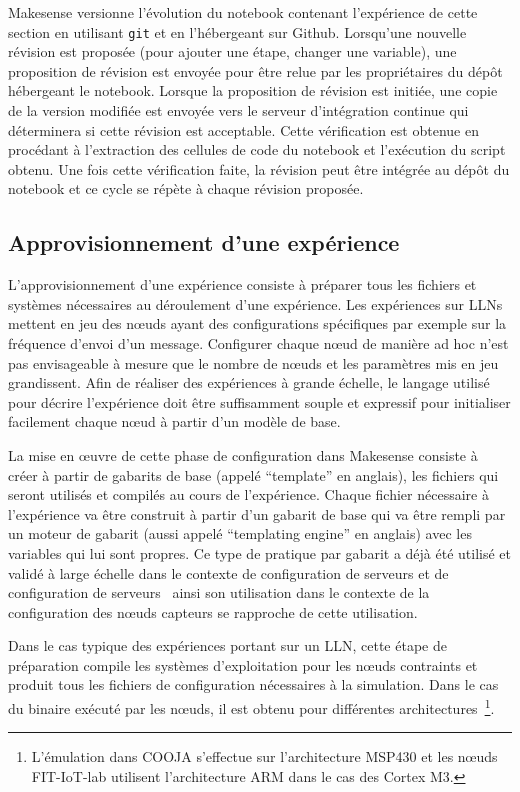 Makesense versionne l'évolution du notebook contenant l'expérience de cette section en utilisant \texttt{git} et en l'hébergeant sur Github.
Lorsqu'une nouvelle révision est proposée (pour ajouter une étape, changer une variable), une proposition de révision est envoyée pour être relue par les propriétaires du dépôt hébergeant le notebook.
Lorsque la proposition de révision est initiée, une copie de la version modifiée est envoyée vers le serveur d'intégration continue qui déterminera si cette révision est acceptable.
Cette vérification est obtenue en procédant à l'extraction des cellules de code du notebook et l'exécution du script obtenu.
Une fois cette vérification faite, la révision peut être intégrée au dépôt du notebook et ce cycle se répète à chaque révision proposée.

\subsection{Approvisionnement d'une expérience}

L'approvisionnement d'une expérience consiste à préparer tous les fichiers et systèmes nécessaires au déroulement d'une expérience.
Les expériences sur \ac{LLN}s mettent en jeu des nœuds ayant des configurations spécifiques par exemple sur la fréquence d'envoi d'un message.
Configurer chaque nœud de manière ad hoc n'est pas envisageable à mesure que le nombre de nœuds et les paramètres mis en jeu grandissent.
Afin de réaliser des expériences à grande échelle, le langage utilisé pour décrire l'expérience doit être suffisamment souple et expressif pour initialiser facilement chaque nœud à partir d'un modèle de base.

La mise en œuvre de cette phase de configuration dans Makesense consiste à créer à partir de gabarits de base (appelé ``template'' en anglais), les fichiers qui seront utilisés et compilés au cours de l'expérience.
Chaque fichier nécessaire à l'expérience va être construit à partir d'un gabarit de base qui va être rempli par un moteur de gabarit (aussi appelé ``templating engine'' en anglais) avec les variables qui lui sont propres.
Ce type de pratique par gabarit a déjà été utilisé et validé à large échelle dans le contexte de configuration de serveurs et de configuration de serveurs~\cite{hochstein2014ansible} ainsi son utilisation dans le contexte de la configuration des nœuds capteurs se rapproche de cette utilisation.

Dans le cas typique des expériences portant sur un \ac{LLN}, cette étape de préparation compile les systèmes d'exploitation pour les nœuds contraints et produit tous les fichiers de configuration nécessaires à la simulation.
Dans le cas du binaire exécuté par les nœuds, il est obtenu pour différentes architectures~\footnote{L'émulation dans COOJA s'effectue sur l'architecture MSP430 et les nœuds FIT-IoT-lab utilisent l'architecture ARM dans le cas des Cortex M3.}.

